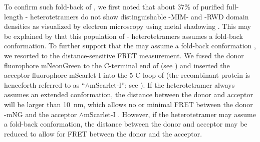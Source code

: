 To confirm such fold-back of , we first noted that about 37\% of purified full-length - heterotetramers do not show distinguishable -MIM- and -RWD domain densities as visualized by electron microscopy using metal shadowing \cite{BUB1-CDC20-MAD1}. This may be explained by that this population of - heterotetramers assumes a fold-back conformation. To further support that the  may assume a fold-back conformation , we resorted to the distance-sensitive FRET measurement. We fused the donor fluorophore mNeonGreen to the C-terminal end of  (see ) and inserted the acceptor fluorophore mScarlet-I into the \textbeta{}5-\textalpha{}C loop of  \cite{mSI, beta5-alphaCLoop} (the recombinant protein is henceforth referred to as ``$\wedge$mScarlet-I''; see ). If the heterotetramer always assumes an extended conformation, the distance between the donor and acceptor will be larger than \SI{10}{nm}, which allows no or minimal FRET between the donor -mNG and the acceptor $\wedge$mScarlet-I \cite{Kukreja2020}. However, if the heterotetramer may assume a fold-back conformation, the distance between the donor and acceptor may be reduced to allow for FRET between the donor and the acceptor.

